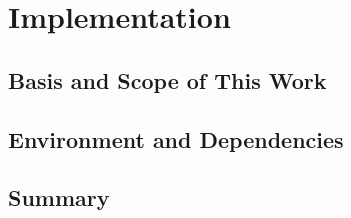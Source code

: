 \chapter{Implementation}
\label{ch:implementation}

\section{Basis and Scope of This Work}

\section{Environment and Dependencies}

\section{Summary}
